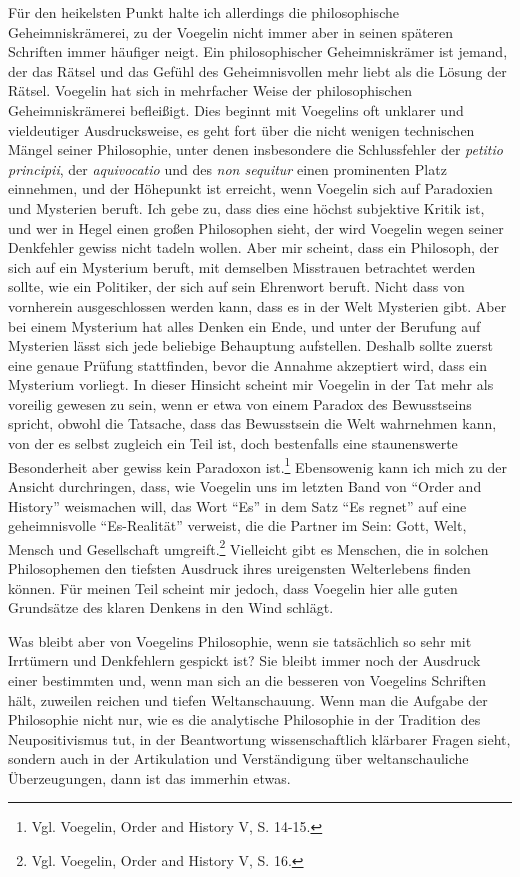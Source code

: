 Für den heikelsten Punkt halte ich allerdings die philosophische
Geheimniskrämerei, zu der Voegelin nicht immer aber in seinen späteren
Schriften immer häufiger neigt. Ein philosophischer Geheimniskrämer ist
jemand, der das Rätsel und das Gefühl des Geheimnisvollen mehr liebt als die
Lösung der Rätsel. Voegelin hat sich in mehrfacher Weise der philosophischen
Geheimniskrämerei befleißigt. Dies beginnt mit Voegelins oft unklarer und
vieldeutiger Ausdrucksweise, es geht fort über die nicht wenigen technischen
Mängel seiner Philosophie, unter denen insbesondere die Schlussfehler der {\it
  petitio principii}, der {\it aquivocatio} und des {\it non sequitur} einen
prominenten Platz einnehmen, und der Höhepunkt ist erreicht, wenn Voegelin
sich auf Paradoxien und Mysterien beruft. Ich gebe zu, dass dies eine höchst
subjektive Kritik ist, und wer in Hegel einen großen Philosophen sieht, der
wird Voegelin wegen seiner Denkfehler gewiss nicht tadeln wollen. Aber mir
scheint, dass ein Philosoph, der sich auf ein Mysterium beruft, mit demselben
Misstrauen betrachtet werden sollte, wie ein Politiker, der sich auf sein
Ehrenwort beruft. Nicht dass von vornherein ausgeschlossen werden kann, dass
es in der Welt Mysterien gibt. Aber bei einem Mysterium hat alles Denken ein
Ende, und unter der Berufung auf Mysterien lässt sich jede beliebige
Behauptung aufstellen. Deshalb sollte zuerst eine genaue Prüfung stattfinden,
bevor die Annahme akzeptiert wird, dass ein Mysterium vorliegt. In dieser
Hinsicht scheint mir Voegelin in der Tat mehr als voreilig gewesen zu sein,
wenn er etwa von einem Paradox des Bewusstseins spricht, obwohl die Tatsache,
dass das Bewusstsein die Welt wahrnehmen kann, von der es selbst zugleich ein
Teil ist, doch bestenfalls eine staunenswerte Besonderheit aber gewiss kein
Paradoxon ist.\footnote{Vgl.  Voegelin, Order and History V, S. 14-15.}
Ebensowenig kann ich mich zu der Ansicht durchringen, dass, wie Voegelin uns
im letzten Band von "`Order and History"' weismachen will, das Wort "`Es"' in
dem Satz "`Es regnet"' auf eine geheimnisvolle "`Es-Realität"' verweist, die
die Partner im Sein: Gott, Welt, Mensch und Gesellschaft
umgreift.\footnote{Vgl. Voegelin, Order and History V, S. 16.} Vielleicht gibt
es Menschen, die in solchen Philosophemen den tiefsten Ausdruck ihres
ureigensten Welterlebens finden können. Für meinen Teil scheint mir jedoch,
dass Voegelin hier alle guten Grundsätze des klaren Denkens in den Wind
schlägt.

Was bleibt aber von Voegelins Philosophie, wenn sie tatsächlich so sehr mit
Irrtümern und Denkfehlern gespickt ist? Sie bleibt immer noch der
Ausdruck einer bestimmten und, wenn man sich an die besseren von Voegelins
Schriften hält, zuweilen reichen und tiefen Weltanschauung. Wenn man die
Aufgabe der Philosophie nicht nur, wie es die analytische Philosophie in der
Tradition des Neupositivismus tut, in der Beantwortung wissenschaftlich
klärbarer Fragen sieht, sondern auch in der Artikulation und Verständigung
über weltanschauliche Überzeugungen, dann ist das immerhin etwas.


